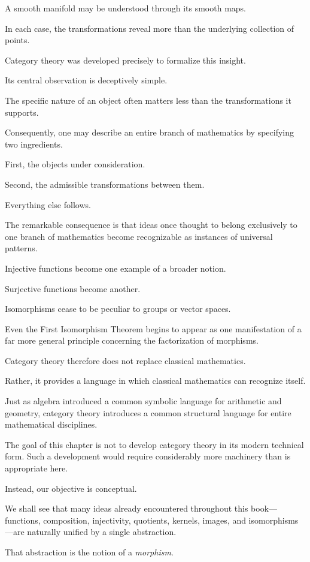 \documentclass[11pt]{book}
\numberwithin{equation}{chapter}
\theoremstyle{definition}
\theoremstyle{plain}
\theoremstyle{remark}
\begin{document}
A smooth manifold may be understood through its smooth maps.

In each case, the transformations reveal more than the underlying collection of points.

Category theory was developed precisely to formalize this insight.

Its central observation is deceptively simple.

The specific nature of an object often matters less than the transformations it supports.

Consequently, one may describe an entire branch of mathematics by specifying two ingredients.

First, the objects under consideration.

Second, the admissible transformations between them.

Everything else follows.

The remarkable consequence is that ideas once thought to belong exclusively to one branch of mathematics become recognizable as instances of universal patterns.

Injective functions become one example of a broader notion.

Surjective functions become another.

Isomorphisms cease to be peculiar to groups or vector spaces.

Even the First Isomorphism Theorem begins to appear as one manifestation of a far more general principle concerning the factorization of morphisms.

Category theory therefore does not replace classical mathematics.

Rather, it provides a language in which classical mathematics can recognize itself.

Just as algebra introduced a common symbolic language for arithmetic and geometry, category theory introduces a common structural language for entire mathematical disciplines.

The goal of this chapter is not to develop category theory in its modern technical form. Such a development would require considerably more machinery than is appropriate here.

Instead, our objective is conceptual.

We shall see that many ideas already encountered throughout this book—functions, composition, injectivity, quotients, kernels, images, and isomorphisms—are naturally unified by a single abstraction.

That abstraction is the notion of a \emph{morphism}.
\end{document}
